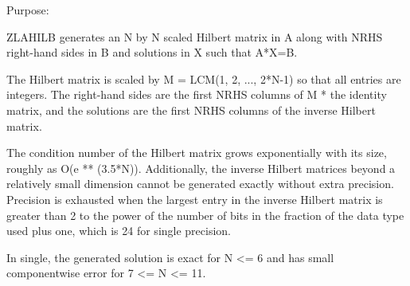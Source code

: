 \begin{DoxyParagraph}{Purpose\+: }
\begin{DoxyVerb} ZLAHILB generates an N by N scaled Hilbert matrix in A along with
 NRHS right-hand sides in B and solutions in X such that A*X=B.

 The Hilbert matrix is scaled by M = LCM(1, 2, ..., 2*N-1) so that all
 entries are integers.  The right-hand sides are the first NRHS
 columns of M * the identity matrix, and the solutions are the
 first NRHS columns of the inverse Hilbert matrix.

 The condition number of the Hilbert matrix grows exponentially with
 its size, roughly as O(e ** (3.5*N)).  Additionally, the inverse
 Hilbert matrices beyond a relatively small dimension cannot be
 generated exactly without extra precision.  Precision is exhausted
 when the largest entry in the inverse Hilbert matrix is greater than
 2 to the power of the number of bits in the fraction of the data type
 used plus one, which is 24 for single precision.

 In single, the generated solution is exact for N <= 6 and has
 small componentwise error for 7 <= N <= 11.\end{DoxyVerb}
 
\end{DoxyParagraph}

